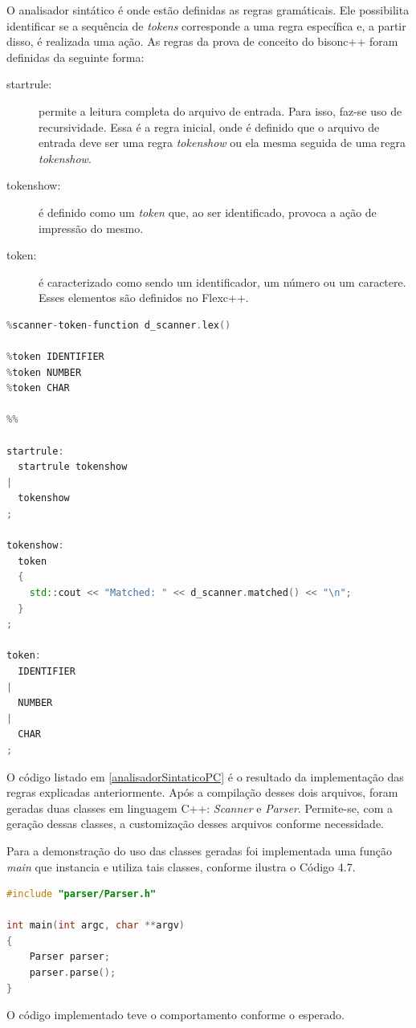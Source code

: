 \par
\indent O analisador sintático é onde estão definidas as regras gramáticais.
Ele possibilita identificar se a sequência de \textit{tokens} corresponde a uma
regra específica e, a partir disso, é realizada uma ação. As regras da prova de
conceito do bisonc++ foram definidas da seguinte forma:
\begin{description}
\item[startrule:] permite a leitura completa do arquivo de entrada. Para isso,
faz-se uso de recursividade. Essa é a regra inicial, onde é definido que o
arquivo de entrada deve ser uma regra \textit{tokenshow} ou ela mesma seguida
de uma regra \textit{tokenshow}.
\item[tokenshow:] é definido como um \textit{token} que, ao ser identificado,
provoca a ação de impressão do mesmo.
\item[token:] é caracterizado como sendo um identificador, um número ou um
caractere. Esses elementos são definidos no Flexc++.
\end{description}

\begin{lstlisting}[language=C++, label=analisadorSintaticoPC, caption=Analisador Sintático da Prova de Conceito do Bisonc++]
%scanner                ../scanner/Scanner.h
%scanner-token-function d_scanner.lex()

%token IDENTIFIER
%token NUMBER
%token CHAR

%%

startrule:
  startrule tokenshow
|
  tokenshow
;

tokenshow:
  token
  {
    std::cout << "Matched: " << d_scanner.matched() << "\n";
  }
;

token:
  IDENTIFIER
|
  NUMBER
|
  CHAR
;
\end{lstlisting}
\par
\indent O código listado em \ref{analisadorSintaticoPC} é o resultado da
implementação das regras explicadas anteriormente. Após a compilação desses dois
arquivos, foram geradas duas classes em linguagem C++: \textit{Scanner} e
\textit{Parser}. Permite-se, com a geração dessas classes, a customização
desses arquivos conforme necessidade.
\par
\indent Para a demonstração do uso das classes geradas foi implementada uma
função \textit{main} que instancia e utiliza tais classes, conforme ilustra o
Código 4.7.
\begin{lstlisting}[language=C++, label=mainPCB, caption=Função \textit{main} para demosntração do Bisonc++]
#include "parser/Parser.h"

int main(int argc, char **argv)
{
    Parser parser;
    parser.parse();
}
\end{lstlisting}
\par
\indent O código implementado teve o comportamento conforme o esperado.

